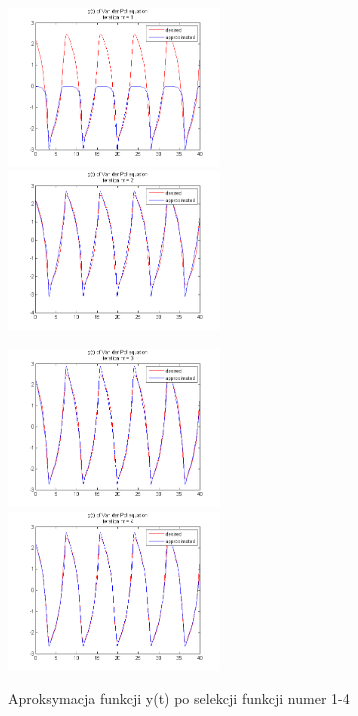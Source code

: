 \begin{figure}[ht!]
	\centering

	\subfloat
	{\includegraphics[width=0.5\textwidth]
	{images/signal_iter1.png}}
	\subfloat
	{\includegraphics[width=0.5\textwidth]
	{images/signal_iter2.png}}
	
	\subfloat
	{\includegraphics[width=0.5\textwidth]
	{images/signal_iter3.png}}
	\subfloat
	{\includegraphics[width=0.5\textwidth]
	{images/signal_iter4.png}}

	\caption{Aproksymacja funkcji y(t) po selekcji funkcji numer 1-4}		
	\label{fig:signal_approx_a}		
\end{figure}

